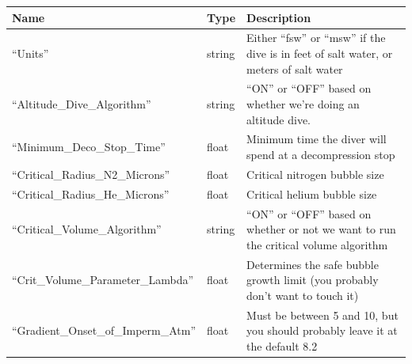 \documentclass[12pt]{article}
\begin{document}
\begin{longtable}{|l|l|p{5cm}|}
\hline
 Name                                  &  Type                                                                                             &  Description                                                                              \\
\hline
 ``Units''                             &  string                                                                                           &  Either ``fsw'' or ``msw'' if the dive is in feet of salt water, or meters of salt water  \\
\hline
 ``Altitude\_Dive\_Algorithm''         &  string                                                                                           &  ``ON'' or ``OFF'' based on whether we're doing an altitude dive.                         \\
\hline
 ``Minimum\_Deco\_Stop\_Time''         &  float                                                                                            &  Minimum time the diver will spend at a decompression stop                                \\
\hline
 ``Critical\_Radius\_N2\_Microns''     &  float                                                             & Critical nitrogen bubble size                                                                                         \\
\hline
 ``Critical\_Radius\_He\_Microns''     &  float                                                               &  Critical helium bubble size                                                                                         \\
\hline
 ``Critical\_Volume\_Algorithm''       &  string  &  ``ON'' or ``OFF'' based on whether or not we want to run the critical volume algorithm                                                                                         \\
\hline
 ``Crit\_Volume\_Parameter\_Lambda''   &  float                                                                                            &  Determines the safe bubble growth limit (you probably don't want to touch it)                                                                                     \\
\hline
 ``Gradient\_Onset\_of\_Imperm\_Atm''  &  float                                                                                            &  Must be between 5 and 10, but you should probably leave it at the default 8.2                                                                                     \\

\end{longtable}
\end{document}
